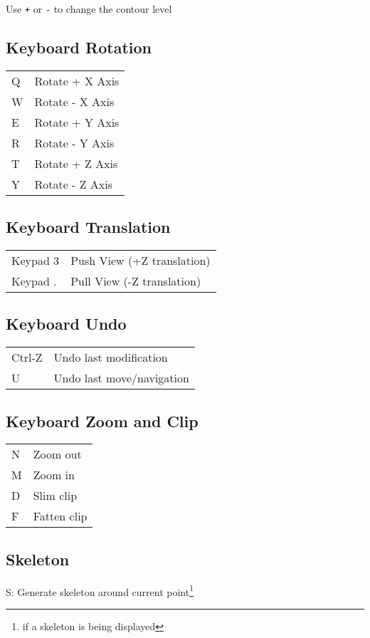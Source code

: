 \documentclass[twocolumn]{article}
\begin{document}
Use \texttt{+} or \texttt{-} to change the contour level

\subsection{Keyboard Rotation}

\begin{tabular}{ll}
  Q & Rotate + X Axis \\
  W & Rotate - X Axis \\
  E & Rotate + Y Axis \\
  R & Rotate - Y Axis \\
  T & Rotate + Z Axis \\
  Y & Rotate - Z Axis \\
\end{tabular}

\subsection{Keyboard Translation}
\begin{tabular}{ll}
  Keypad 3 & Push View (+Z translation)\\
  Keypad . & Pull View (-Z translation)
\end{tabular}

\subsection{Keyboard Undo}
\begin{tabular}{ll}

  Ctrl-Z & Undo last modification   \\
  U & Undo last move/navigation     \\
\end{tabular}


\subsection{Keyboard Zoom and Clip}

\begin{tabular}{ll}

  N & Zoom out   \\
  M & Zoom in    \\
  D & Slim clip  \\
  F & Fatten clip\\
\end{tabular}

\subsection{Skeleton}
S: Generate skeleton around current point\footnote{if a skeleton is being
displayed}
\end{document}
